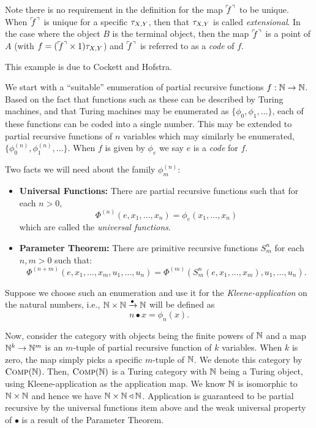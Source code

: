Note there is no requirement in the definition for the map ${}^\ulcorner\!\!f^\urcorner$ to be unique. When ${}^\ulcorner\!\!f^\urcorner$ is unique
for a specific $\tau_{{X},{Y}}$, then that $\tau_{{X},{Y}}$ is called \emph{extensional}. In the case where the object
$B$ is the terminal object, then the map ${}^\ulcorner\!\!f^\urcorner$ is a point of $A$ (with $f = ({}^\ulcorner\!\!f^\urcorner \times 1)\tau_{{X},{Y}}$) and
${}^\ulcorner\!\!f^\urcorner$ is referred to as a \emph{code} of $f$.

\begin{example}\label{ex:turing-category-kleene}
  This example is due to Cockett and Hofstra\cite{cockett-hostra08-intro-to-turing}.

  We start with a ``suitable'' enumeration of partial recursive functions $f:\mathbb{N}\to\mathbb{N}$. Based on
  the fact that functions such as these can be described by Turing machines, and that Turing
  machines may be enumerated as $\{\phi_0,\phi_1,\ldots\}$, each of these functions can be coded
  into a single number. This may be extended to partial recursive functions of $n$ variables which
  may similarly be enumerated, $\{\phi_0^{(n)},\phi_1^{(n)},\ldots\}$. When $f$ is given by $\phi_e$
  we say $e$ is a \emph{code} for $f$.

  Two facts we will need about the family $\phi_m^{(n)}$:
  \begin{itemize}
    \item \textbf{Universal Functions:} There are partial recursive functions such that for each $n > 0$,
      \[ \Phi^{(n)}(e,x_1,\ldots,x_n) = \phi_e(x_1,\ldots,x_n) \]
      which are called the \emph{universal functions}.
    \item \textbf{Parameter Theorem:} There are primitive recursive functions $S_m^n$ for each $n,m >
      0$ such that:
      \[ \Phi^{(n+m)}(e,x_1,\ldots,x_m,u_1,\ldots,u_n) = \Phi^{(m)}(S_m^n(e,x_1,\ldots,x_m),u_1,\ldots,u_n).\]
  \end{itemize}

  Suppose we choose such an enumeration and use it for the \emph{Kleene-application} on the natural
  numbers, i.e., $\mathbb{N}\times\mathbb{N}\xrightarrow{\bullet}\mathbb{N}$ will be defined as
  \[
    n\bullet x = \phi_n(x).
  \]

  Now, consider the category with objects being the finite powers of $\mathbb{N}$ and a map $\mathbb{N}^k \to
  \mathbb{N}^m$ is an $m$-tuple of partial recursive function of $k$ variables. When $k$ is zero, the map
  simply picks a specific $m$-tuple of $\mathbb{N}$. We denote this category by $\textsc{Comp}(\mathbb{N})$.
  Then, $\textsc{Comp}(\mathbb{N})$ is a Turing category with $\mathbb{N}$ being a Turing object, using Kleene-application
  as the application map. We know $\mathbb{N}$ is isomorphic to $\mathbb{N}\times \mathbb{N}$ and hence we have $\mathbb{N}\times \mathbb{N}
  \triangleleft \mathbb{N}$. Application is guaranteed to be partial recursive by the universal functions item
  above and the weak universal property of $\bullet$ is a result of the Parameter Theorem.
\end{example}

